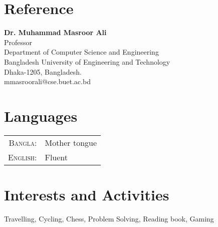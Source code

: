 \documentclass[a4paper,10pt]{article}
\begin{document}
\section{Reference}
\textbf{Dr. Muhammad Masroor Ali} \\
Professor\\
Department of Computer Science and Engineering\\
Bangladesh University of Engineering and Technology\\
Dhaka-1205, Bangladesh.\\
mmasroorali@cse.buet.ac.bd
\section{Languages}
\begin{tabular}{rl}
\textsc{Bangla:}&Mother tongue\\
\textsc{English:}&Fluent\\
\end{tabular}

\section{Interests and Activities}
 Travelling, Cycling, Chess, Problem Solving, Reading book, Gaming\\
\end{document}
